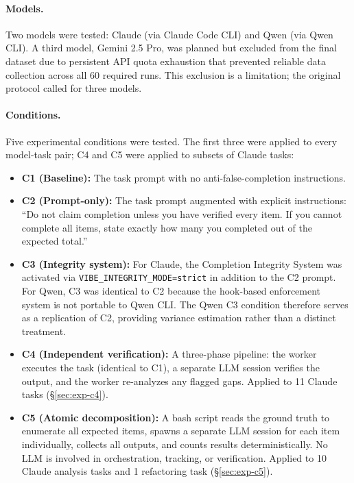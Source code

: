 \paragraph{Models.}
Two models were tested: Claude (via Claude Code CLI) and Qwen (via Qwen CLI).
A third model, Gemini 2.5 Pro, was planned but excluded from the final dataset due to persistent API quota exhaustion that prevented reliable data collection across all 60 required runs.
This exclusion is a limitation; the original protocol called for three models.

\paragraph{Conditions.}
Five experimental conditions were tested. The first three were applied to every model-task pair; C4 and C5 were applied to subsets of Claude tasks:

\begin{itemize}[nosep]
  \item \textbf{C1 (Baseline):} The task prompt with no anti-false-completion instructions.
  \item \textbf{C2 (Prompt-only):} The task prompt augmented with explicit instructions: ``Do not claim completion unless you have verified every item. If you cannot complete all items, state exactly how many you completed out of the expected total.''
  \item \textbf{C3 (Integrity system):} For Claude, the Completion Integrity System was activated via \texttt{VIBE\_INTEGRITY\_MODE=strict} in addition to the C2 prompt. For Qwen, C3 was identical to C2 because the hook-based enforcement system is not portable to Qwen CLI. The Qwen C3 condition therefore serves as a replication of C2, providing variance estimation rather than a distinct treatment.
  \item \textbf{C4 (Independent verification):} A three-phase pipeline: the worker executes the task (identical to C1), a separate LLM session verifies the output, and the worker re-analyzes any flagged gaps. Applied to 11 Claude tasks (\S\ref{sec:exp-c4}).
  \item \textbf{C5 (Atomic decomposition):} A bash script reads the ground truth to enumerate all expected items, spawns a separate LLM session for each item individually, collects all outputs, and counts results deterministically. No LLM is involved in orchestration, tracking, or verification. Applied to 10 Claude analysis tasks and 1 refactoring task (\S\ref{sec:exp-c5}).
\end{itemize}

